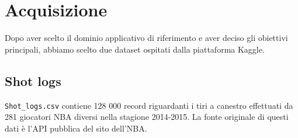 \section{Acquisizione}

Dopo aver scelto il dominio applicativo di riferimento e aver deciso gli obiettivi principali, abbiamo scelto due dataset ospitati dalla piattaforma Kaggle.

\subsection{Shot logs}


\texttt{Shot\_logs.csv}\cite{shot_logs} contiene 128 000 record riguardanti i tiri a canestro effettuati da 281 giocatori NBA diversi nella stagione 2014-2015. La fonte originale di questi dati è l’API pubblica del sito dell’NBA.
